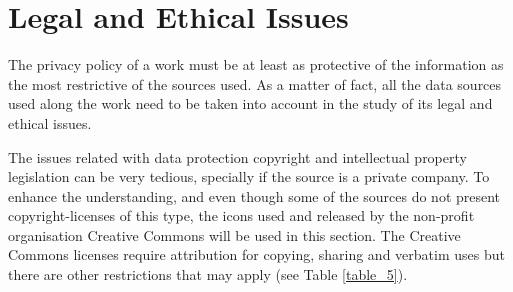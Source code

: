 \section{Legal and Ethical Issues}\label{sec:legalandethicalissues}


The privacy policy of a work must be at least as protective of the information as the most restrictive of the sources used. As a matter of fact, all the data sources used along the work need to be taken into account in the study of its legal and ethical issues.

The issues related with data protection copyright and intellectual property legislation can be very tedious, specially if the source is a private company. To enhance the understanding, and even though some of the sources do not present copyright-licenses of this type, the icons used and released by the non-profit organisation Creative Commons will be used in this section. The Creative Commons licenses  require attribution for copying, sharing and verbatim uses but there are other restrictions that may apply (see Table \ref{table_5}).

